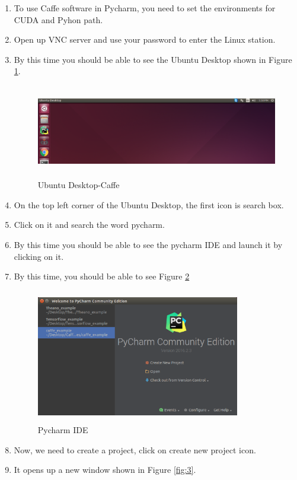 \documentclass[12pt]{article}
\begin{document}
\begin{enumerate}
  \item To use Caffe software in Pycharm, you need to set the environments for CUDA and Pyhon path.
  \item Open up VNC server and use your password to enter the Linux station.
  \item By this time you should be able to see the Ubuntu Desktop shown in Figure \ref{fig:1}.
\begin{figure}[h]
	\centerline{\includegraphics[width=6in, height=1.6in]{fig/1.eps}}
	\caption{Ubuntu Desktop-Caffe}
	\label{fig:1}
\end{figure}
  \item On the top left corner of the Ubuntu Desktop, the first icon is search box.
  \item Click on it and search the word pycharm.
  \item By this time you should be able to see the pycharm IDE and launch it by clicking on it.
  \item By this time, you should be able to see Figure \ref{fig:2}
\begin{figure}[h]
	\centerline{\includegraphics[width=3.5in, height=2.3in]{fig/2.eps}}
	\caption{Pycharm IDE}
	\label{fig:2}
\end{figure}
  \item Now, we need to create a project, click on create new project icon.
  \item It opens up a new window shown in Figure \ref{fig:3}.

\end{enumerate}
\end{document}
